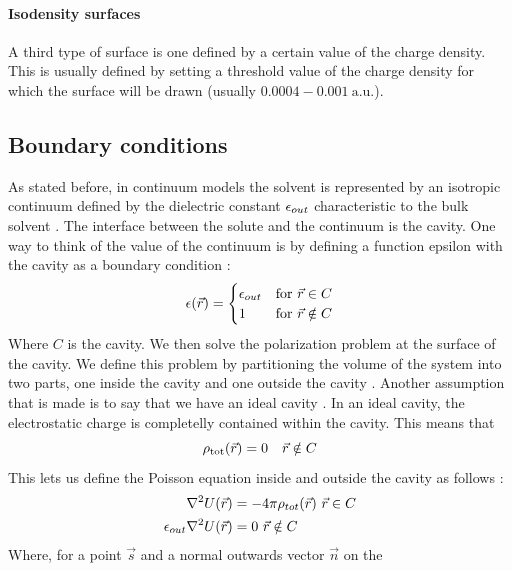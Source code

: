 \documentclass[../master_thesis.tex]{subfiles}
\begin{document}
\paragraph{Isodensity surfaces}
A third type of surface is one defined by a certain value of the charge density.
This is usually defined by setting a threshold value of the charge density for
which the surface will be drawn (usually $0.0004-0.001\ \text{a.u.}$)\cite{Tomasi:2005ipa}.


\subsection{Boundary conditions}
As stated before, in continuum models the solvent is represented by an isotropic
continuum defined by the dielectric constant $\epsilon_{out}$ characteristic to the bulk
solvent \cite{Tomasi:1994wt}. The interface between the solute and the continuum
is the cavity. One way to think of the value of the continuum is by defining a
function epsilon with the cavity as a boundary condition \cite{Tomasi:2005ipa, Tomasi:1994wt}:
\begin{equation}
  \epsilon(\vec{r}) =
  \begin{cases}
  \epsilon_{out} & \text{for} \ \vec{r}\in C\\
  1 & \text{for}\ \vec{r} \notin C
\end{cases}
\end{equation}
Where $C$ is the cavity. We then solve the polarization problem at the surface
of the cavity. We define this problem by partitioning the volume of the system
into two parts, one inside the cavity and one outside the cavity \cite{Tomasi:1994wt}.
Another assumption that is made is to say that we have an ideal cavity
\cite{Cramer:2004, Tomasi:1994wt}. In an ideal cavity, the electrostatic charge
is completelly contained within the cavity. This means that \cite{Tomasi:1994wt}
\begin{equation}
  \rho_{\mathrm{tot}}(\vec{r})=0 \quad \vec{r} \notin C
\end{equation}
This lets us define the Poisson equation inside and outside the cavity as follows
\cite{Sorland, Tomasi:1994wt}:
\begin{align}
  \begin{split}
    \nabla^2U(\vec{r}) &= -4\pi\rho_{tot}(\vec{r})\ \vec{r}\in C\\
    \epsilon_{out}\nabla^2U(\vec{r}) &= 0 \ \vec{r} \notin C
  \end{split}
\end{align}
Where, for a point $\vec{s}$ and a normal outwards vector $\vec{n}$ on the
\end{document}
